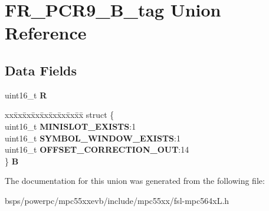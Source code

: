 \hypertarget{unionFR__PCR9__16B__tag}{}\section{F\+R\+\_\+\+P\+C\+R9\+\_\+B\+\_\+tag Union Reference}
\label{unionFR__PCR9__16B__tag}
\subsection*{Data Fields}
\begin{DoxyCompactItemize}
\item 
\mbox{\label{unionFR__PCR9__16B__tag_aa67c4e0ddb7f9a134b78e525296e4097}} 
uint16\+\_\+t {\bfseries R}
\item 
\mbox{\label{unionFR__PCR9__16B__tag_ae40925c869a12bb48c04ca3c1be52c4c}} 
\begin{tabbing}
xx\=xx\=xx\=xx\=xx\=xx\=xx\=xx\=xx\=\kill
struct \{\\
\>uint16\_t {\bfseries MINISLOT\_EXISTS}:1\\
\>uint16\_t {\bfseries SYMBOL\_WINDOW\_EXISTS}:1\\
\>uint16\_t {\bfseries OFFSET\_CORRECTION\_OUT}:14\\
\} {\bfseries B}\\

\end{tabbing}\end{DoxyCompactItemize}


The documentation for this union was generated from the following file\+:\begin{DoxyCompactItemize}
\item 
bsps/powerpc/mpc55xxevb/include/mpc55xx/fsl-\/mpc564x\+L.\+h\end{DoxyCompactItemize}
